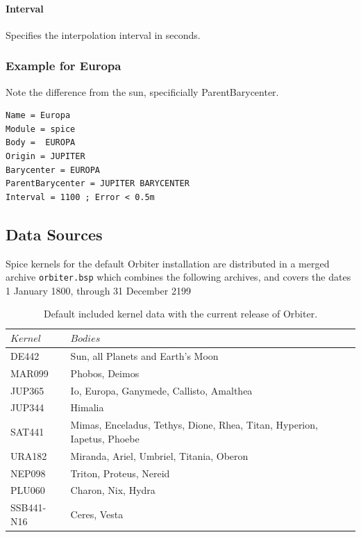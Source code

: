 \documentclass[Orbiter Technical Reference.tex]{subfiles}
\begin{document}
\paragraph{Interval}
Specifies the interpolation interval in seconds.

\subsubsection{Example for Europa}
Note the difference from the sun, specificially ParentBarycenter.
\begin{verbatim}
Name = Europa
Module = spice
Body = 	EUROPA
Origin = JUPITER
Barycenter = EUROPA
ParentBarycenter = JUPITER BARYCENTER
Interval = 1100 ; Error < 0.5m
\end{verbatim}


\subsection{Data Sources}

Spice kernels for the default Orbiter installation are distributed in a merged archive \texttt{orbiter.bsp} which combines the following archives, and covers the dates 1 January 1800, through 31 December 2199

\begin{table}[]
\begin{tabular}{|l|l|}
\hline
$Kernel$             & $Bodies$                                                                \\ \hline
DE442\cite{DE440}\cite{DE442}     & Sun, all Planets and Earth's Moon                          \\ \hline
MAR099\cite{MAR099}  & Phobos, Deimos                                                          \\ \hline
JUP365\cite{JUP365}  & Io, Europa, Ganymede, Callisto, Amalthea                                \\ \hline
JUP344\cite{JUP344}  & Himalia                                                                 \\ \hline
SAT441\cite{SAT441}  & Mimas, Enceladus, Tethys, Dione, Rhea, Titan, Hyperion, Iapetus, Phoebe \\ \hline
URA182\cite{URA182}  & Miranda, Ariel, Umbriel, Titania, Oberon                                \\ \hline
NEP098\cite{NEP098}  & Triton, Proteus, Nereid                                                 \\ \hline
PLU060\cite{PLU060}  & Charon, Nix, Hydra                                                      \\ \hline
SSB441-N16\cite{SSB441-N16}    & Ceres, Vesta                                                  \\ \hline
\end{tabular}
\caption{Default included kernel data with the current release of Orbiter.}
\label{tab:spicedata}
\end{table}
\end{document}
